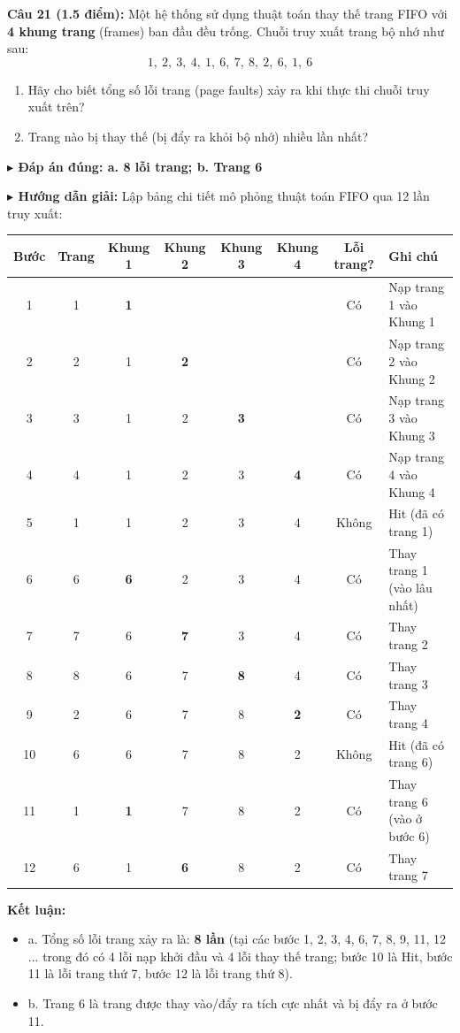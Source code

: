 \documentclass[11pt,a4paper]{article}
\newcommand{\giaithich}[2]{%
    \par\vspace{0.15cm}\noindent
    \begingroup\small
    \noindent\textbf{\color{blue}$\blacktriangleright$ Đáp án đúng: #1} \par\vspace{0.08cm}
    \noindent\textbf{\color{teal}$\blacktriangleright$ Hướng dẫn giải:} #2
    \endgroup\par\vspace{0.35cm}
}
\begin{document}
\vspace{0.3cm}
\noindent\textbf{Câu 21 (1.5 điểm):}
Một hệ thống sử dụng thuật toán thay thế trang FIFO với \textbf{4 khung trang} (frames) ban đầu đều trống. Chuỗi truy xuất trang bộ nhớ như sau:
\[ 1,\ 2,\ 3,\ 4,\ 1,\ 6,\ 7,\ 8,\ 2,\ 6,\ 1,\ 6 \]
\begin{enumerate}[label=\alph*.,leftmargin=1.5em]
    \item Hãy cho biết tổng số lỗi trang (page faults) xảy ra khi thực thi chuỗi truy xuất trên?
    \item Trang nào bị thay thế (bị đẩy ra khỏi bộ nhớ) nhiều lần nhất?
\end{enumerate}
\giaithich{a. 8 lỗi trang; b. Trang 6}{Lập bảng chi tiết mô phỏng thuật toán FIFO qua 12 lần truy xuất:
\begin{center}
\begin{tabular}{|c|c|c|c|c|c|c|l|}
\hline
\textbf{Bước} & \textbf{Trang} & \textbf{Khung 1} & \textbf{Khung 2} & \textbf{Khung 3} & \textbf{Khung 4} & \textbf{Lỗi trang?} & \textbf{Ghi chú} \\ \hline
1 & 1 & \textbf{1} & & & & Có & Nạp trang 1 vào Khung 1 \\ \hline
2 & 2 & 1 & \textbf{2} & & & Có & Nạp trang 2 vào Khung 2 \\ \hline
3 & 3 & 1 & 2 & \textbf{3} & & Có & Nạp trang 3 vào Khung 3 \\ \hline
4 & 4 & 1 & 2 & 3 & \textbf{4} & Có & Nạp trang 4 vào Khung 4 \\ \hline
5 & 1 & 1 & 2 & 3 & 4 & Không & Hit (đã có trang 1) \\ \hline
6 & 6 & \textbf{6} & 2 & 3 & 4 & Có & Thay trang 1 (vào lâu nhất) \\ \hline
7 & 7 & 6 & \textbf{7} & 3 & 4 & Có & Thay trang 2 \\ \hline
8 & 8 & 6 & 7 & \textbf{8} & 4 & Có & Thay trang 3 \\ \hline
9 & 2 & 6 & 7 & 8 & \textbf{2} & Có & Thay trang 4 \\ \hline
10 & 6 & 6 & 7 & 8 & 2 & Không & Hit (đã có trang 6) \\ \hline
11 & 1 & \textbf{1} & 7 & 8 & 2 & Có & Thay trang 6 (vào ở bước 6) \\ \hline
12 & 6 & 1 & \textbf{6} & 8 & 2 & Có & Thay trang 7 \\ \hline
\end{tabular}
\end{center}
\textbf{Kết luận:}
\begin{itemize}[noitemsep,topsep=1pt]
    \item a. Tổng số lỗi trang xảy ra là: \textbf{8 lần} (tại các bước 1, 2, 3, 4, 6, 7, 8, 9, 11, 12 ... trong đó có 4 lỗi nạp khởi đầu và 4 lỗi thay thế trang; bước 10 là Hit, bước 11 là lỗi trang thứ 7, bước 12 là lỗi trang thứ 8).
    \item b. Trang 6 là trang được thay vào/đẩy ra tích cực nhất và bị đẩy ra ở bước 11.
\end{itemize}}
\end{document}
